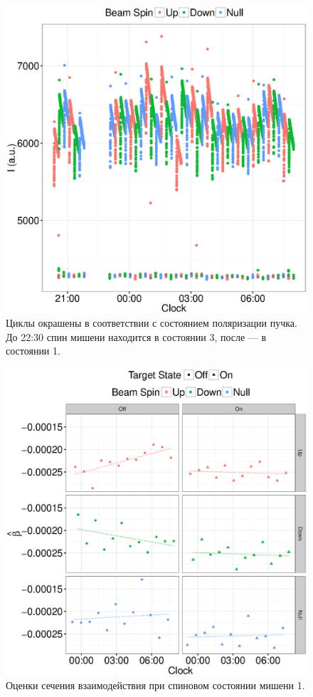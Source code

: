 \documentclass{article}
\begin{document}
	\begin{figure}[h!]
		\centering
		\includegraphics[scale=.7]{Cycles2016.eps}
		\caption{Циклы окрашены в соответствии с состоянием поляризации пучка. До 22:30 спин мишени находится в состоянии 3, после --- в состоянии 1.\label{fig:Cycles}}
	\end{figure}
	\begin{figure}[h!]
		\centering
		\includegraphics[scale=.7]{Slopes2016_VS_Clock.eps}
		\caption{Оценки сечения взаимодействия при спиновом состоянии мишени 1.\label{fig:Slopes}}
	\end{figure}	
	
\end{document}

